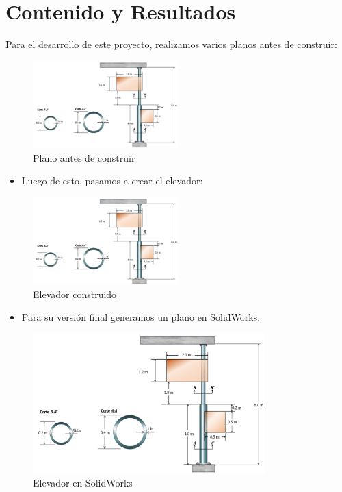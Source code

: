 \documentclass{article}
\theoremstyle{mytheoremstyle}
\theoremstyle{mytheoremstyle}
\theoremstyle{myproblemstyle}
\begin{document}
\section*{Contenido y Resultados}
Para el desarrollo de este proyecto, realizamos varios planos antes de construir:
\begin{figure}[H]
\centering
\includegraphics[width=0.5\textwidth]{Picture1.jpg}
\caption{Plano antes de construir}
\label{fig:imagen}
\end{figure}
\begin{itemize}
\item Luego de esto, pasamos a crear el elevador:
\end{itemize}
\begin{figure}[H]
\centering
\includegraphics[width=0.5\textwidth]{Picture1.jpg}
\caption{Elevador construido}
\label{fig:imagen1}
\end{figure}
\begin{itemize}
\item Para su versión final generamos un plano en SolidWorks.
\end{itemize}
\begin{figure}[H]
    \centering
    \includegraphics[width=0.8\textwidth]{Picture1.jpg}
    \caption{Elevador en SolidWorks}
    \label{fig:imagen2}
    \end{figure}
\end{document}
